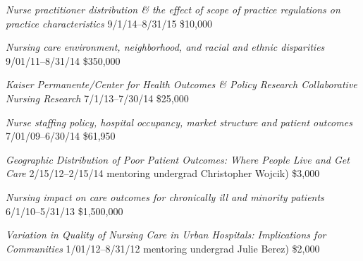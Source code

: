 \documentclass[10pt,]{article}
\begin{document}
{{{{{{{{{{{{{{\textit {Nurse practitioner distribution \& the effect of scope of practice regulations on practice characteristics} \hfill 9/1/14--8/31/15 \newline
{}	\hfill \$10,000

\textit {Nursing care environment, neighborhood, and racial and ethnic disparities} \hfill 9/01/11--8/31/14 \newline
{} \hfill \$350,000

\textit {Kaiser Permanente/Center for Health Outcomes \& Policy Research Collaborative Nursing Research} \hfill 7/1/13--7/30/14 \newline
{} \hfill \$25,000

\textit {Nurse staffing policy, hospital occupancy, market structure and patient outcomes} \hfill 7/01/09--6/30/14 \newline
{} \hfill \$61,950

\textit {Geographic Distribution of Poor Patient Outcomes: Where People Live and Get Care} \hfill 2/15/12--2/15/14 \newline
{ mentoring undergrad Christopher Wojcik)}	\hfill \$3,000

\textit {Nursing impact on care outcomes for chronically ill and minority patients} \hfill 6/1/10--5/31/13 \newline
{}	\hfill \$1,500,000

\textit {Variation in Quality of Nursing Care in Urban Hospitals: Implications for Communities} \hfill 1/01/12--8/31/12 \newline
{ mentoring undergrad Julie Berez)} \hfill \$2,000

}}}}}}}}}}}}}}
\end{document}
